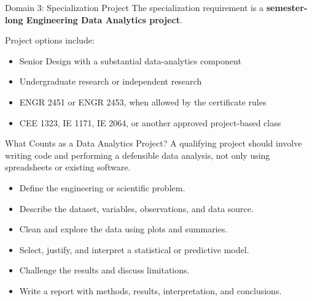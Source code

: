 \documentclass[aspectratio=169,11pt,t]{beamer}
\newcommand{\tightitems}{\setlength\itemsep{1pt}\setlength\parskip{0pt}}
\begin{document}
\begin{frame}[t]{Domain 3: Specialization Project}
The specialization requirement is a \textbf{semester-long Engineering Data Analytics project}.

\vspace{0.25cm}
Project options include:
\begin{itemize}[<+->]
  \tightitems
  \item Senior Design with a substantial data-analytics component
  \item Undergraduate research or independent research
  \item ENGR 2451 or ENGR 2453, when allowed by the certificate rules
  \item CEE 1323, IE 1171, IE 2064, or another approved project-based class
\end{itemize}

\vspace{0.2cm}
\end{frame}

\begin{frame}[t]{What Counts as a Data Analytics Project?}
A qualifying project should involve writing code and performing a defensible data analysis, not only using spreadsheets or existing software.

\vspace{0.25cm}
\begin{itemize}[<+->]
  \tightitems
  \item Define the engineering or scientific problem.
  \item Describe the dataset, variables, observations, and data source.
  \item Clean and explore the data using plots and summaries.
  \item Select, justify, and interpret a statistical or predictive model.
  \item Challenge the results and discuss limitations.
  \item Write a report with methods, results, interpretation, and conclusions.
\end{itemize}
\end{frame}
\end{document}
